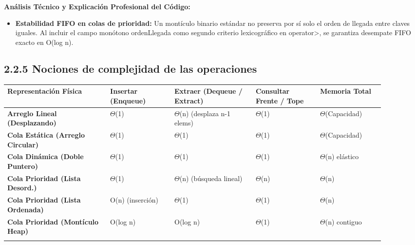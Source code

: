 \documentclass[11pt,letterpaper]{article}
\begin{document}
\noindent\textbf{\color{ipnguinda}Análisis Técnico y Explicación Profesional del Código:}\par\vspace{-2pt}
\begin{itemize}
\setlength{\itemsep}{2pt}\setlength{\parskip}{0pt}
  \item \textbf{Estabilidad FIFO en colas de prioridad: }Un montículo binario estándar no preserva por sí solo el orden de llegada entre claves iguales. Al incluir el campo monótono ordenLlegada como segundo criterio lexicográfico en operator>, se garantiza desempate FIFO exacto en O(log n).
\end{itemize}
\subsection*{2.2.5 Nociones de complejidad de las operaciones}
\vspace{4pt}\noindent
\begin{tabular}{>{\raggedright\arraybackslash}p{0.249\linewidth}>{\raggedright\arraybackslash}p{0.152\linewidth}>{\raggedright\arraybackslash}p{0.194\linewidth}>{\raggedright\arraybackslash}p{0.152\linewidth}>{\raggedright\arraybackslash}p{0.152\linewidth}}
\toprule
\textbf{\color{ipnguinda}Representación Física} & \textbf{\color{ipnguinda}Insertar (Enqueue)} & \textbf{\color{ipnguinda}Extraer (Dequeue / Extract)} & \textbf{\color{ipnguinda}Consultar Frente / Tope} & \textbf{\color{ipnguinda}Memoria Total} \\
\midrule
\textbf{Arreglo Lineal (Desplazando)} & $\Theta$(1) & $\Theta$(n) (desplaza n-1 elems) & $\Theta$(1) & $\Theta$(Capacidad) \\
\addlinespace[3pt]
\textbf{Cola Estática (Arreglo Circular)} & $\Theta$(1) & $\Theta$(1) & $\Theta$(1) & $\Theta$(Capacidad) \\
\addlinespace[3pt]
\textbf{Cola Dinámica (Doble Puntero)} & $\Theta$(1) & $\Theta$(1) & $\Theta$(1) & $\Theta$(n) elástico \\
\addlinespace[3pt]
\textbf{Cola Prioridad (Lista Desord.)} & $\Theta$(1) & $\Theta$(n) (búsqueda lineal) & $\Theta$(n) & $\Theta$(n) \\
\addlinespace[3pt]
\textbf{Cola Prioridad (Lista Ordenada)} & O(n) (inserción) & $\Theta$(1) & $\Theta$(1) & $\Theta$(n) \\
\addlinespace[3pt]
\textbf{Cola Prioridad (Montículo Heap)} & O(log n) & O(log n) & $\Theta$(1) & $\Theta$(n) contiguo \\
\addlinespace[3pt]
\bottomrule
\end{tabular}
\vspace{6pt}\par
\end{document}
